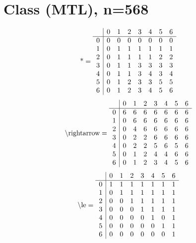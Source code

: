 \documentclass[11pt]{article}
\begin{document}
\section{Class (MTL), n=568}
\[\text{*} = 
\begin{array}{r | r r r r r r r}
 & 0 & 1 & 2 & 3 & 4 & 5 & 6 \\ \hline
0 & 0 & 0 & 0 & 0 & 0 & 0 & 0 \\
1 & 0 & 1 & 1 & 1 & 1 & 1 & 1 \\
2 & 0 & 1 & 1 & 1 & 1 & 2 & 2 \\
3 & 0 & 1 & 1 & 3 & 3 & 3 & 3 \\
4 & 0 & 1 & 1 & 3 & 4 & 3 & 4 \\
5 & 0 & 1 & 2 & 3 & 3 & 5 & 5 \\
6 & 0 & 1 & 2 & 3 & 4 & 5 & 6 \\
\end{array}
\]
\[\text{\textbackslash rightarrow} = 
\begin{array}{r | r r r r r r r}
 & 0 & 1 & 2 & 3 & 4 & 5 & 6 \\ \hline
0 & 6 & 6 & 6 & 6 & 6 & 6 & 6 \\
1 & 0 & 6 & 6 & 6 & 6 & 6 & 6 \\
2 & 0 & 4 & 6 & 6 & 6 & 6 & 6 \\
3 & 0 & 2 & 2 & 6 & 6 & 6 & 6 \\
4 & 0 & 2 & 2 & 5 & 6 & 5 & 6 \\
5 & 0 & 1 & 2 & 4 & 4 & 6 & 6 \\
6 & 0 & 1 & 2 & 3 & 4 & 5 & 6 \\
\end{array}
\]
\[\text{\textbackslash le} = 
\begin{array}{r | r r r r r r r}
 & 0 & 1 & 2 & 3 & 4 & 5 & 6 \\ \hline
0 & 1 & 1 & 1 & 1 & 1 & 1 & 1 \\
1 & 0 & 1 & 1 & 1 & 1 & 1 & 1 \\
2 & 0 & 0 & 1 & 1 & 1 & 1 & 1 \\
3 & 0 & 0 & 0 & 1 & 1 & 1 & 1 \\
4 & 0 & 0 & 0 & 0 & 1 & 0 & 1 \\
5 & 0 & 0 & 0 & 0 & 0 & 1 & 1 \\
6 & 0 & 0 & 0 & 0 & 0 & 0 & 1 \\
\end{array}
\]
\end{document}
